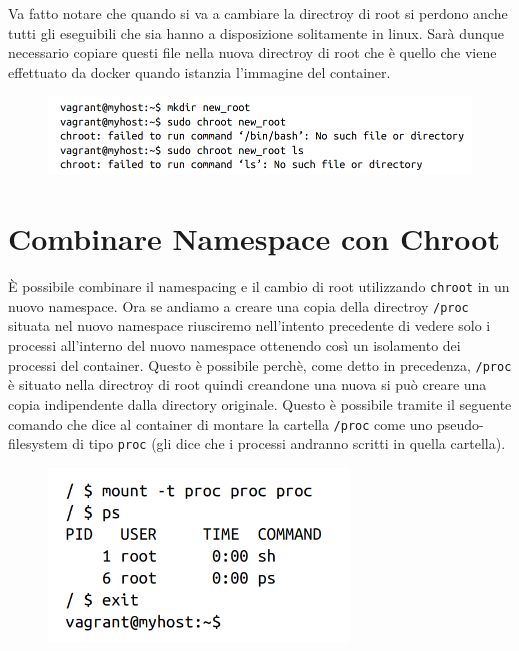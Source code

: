 Va fatto notare che quando si va a cambiare la directroy di root si perdono anche
tutti gli eseguibili che sia hanno a disposizione solitamente in linux. Sarà
dunque necessario copiare questi file nella nuova directroy di root che è
quello che viene effettuato da docker quando istanzia l'immagine del container.

\begin{figure}[H]
    \centering
    \includegraphics[width=\textwidth, keepaspectratio]{capitoli/os_security/imgs/root2.png}
\end{figure}

\section{Combinare Namespace con Chroot}

È possibile combinare il namespacing e il cambio di root utilizzando \verb|chroot|
in un nuovo namespace. Ora se andiamo a creare una copia della directroy
\verb|/proc| situata nel nuovo namespace riusciremo nell'intento precedente
di vedere solo i processi all'interno del nuovo namespace ottenendo così un
isolamento dei processi del container. Questo è possibile perchè, come detto
in precedenza, \verb|/proc| è situato nella directroy di root quindi creandone una
nuova si può creare una copia indipendente dalla directory originale.
Questo è possibile tramite il seguente comando che dice al container di montare
la cartella \verb|/proc| come uno pseudo-filesystem di tipo \verb|proc|
(gli dice che i processi andranno scritti in quella cartella).

\begin{figure}[H]
    \centering
    \includegraphics[width=8cm, keepaspectratio]{capitoli/os_security/imgs/insieme1.png}
\end{figure}

